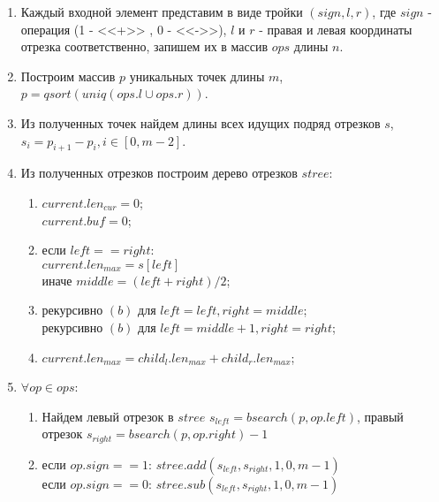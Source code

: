 \documentclass[12pt]{article}
\begin{document}
\begin{enumerate}

\item Каждый входной элемент представим в виде тройки $(sign,l,r)$, где $sign$ - операция (1 - <<+>> , 0 - <<->>), $l$ и $r$ - правая и левая координаты  отрезка соответственно, запишем их в массив $ops$ длины $n$.

\item Построим массив $p$ уникальных точек длины $m$, $p = qsort(uniq(ops.l \cup ops.r))$.

\item Из полученных точек найдем длины всех идущих подряд отрезков $s$, $s_i = p_{i+1} - p_i, i \in [0, m-2]$.

\item Из полученных отрезков построим дерево отрезков $stree$:

	\begin{enumerate}

	\item $current.len_{cur} = 0$;\\
		  $current.buf = 0$;

	\item если $left == right$:\\
		  $current.len_{max} = s[left]$\\	
	      иначе	$middle = (left + right)/2$;

	\item рекурсивно $(b)$ для $left = left, right = middle$;\\
		  рекурсивно $(b)$ для $left = middle + 1, right = right$;\\
		  
	\item $current.len_{max} = child_{l}.len_{max} + child_{r}.len_{max}$;	
		  
		
	\end{enumerate}

\item $\forall op \in ops$:

	\begin{enumerate}
	
	\item Найдем левый отрезок в $stree$ $s_{left} = bsearch(p, op.left)$, правый отрезок $s_{right} = bsearch(p, op.right) - 1$
	
	\item если $op.sign == 1$: $stree.add(s_{left}, s_{right}, 1, 0, m-1)$ \\
		  если $op.sign == 0$: $stree.sub(s_{left}, s_{right}, 1, 0, m-1)$ \\		  
		  

\end{enumerate}
\end{enumerate}
\end{document}
